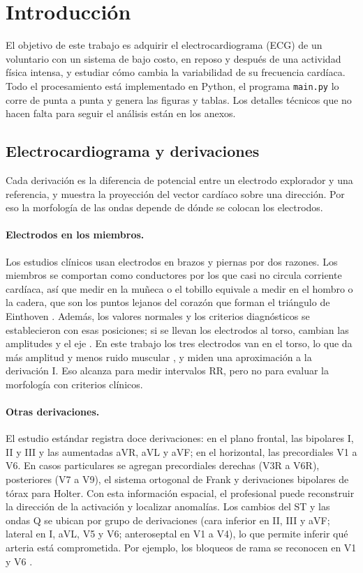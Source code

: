 \section{Introducción}
\label{sec:introduccion}

El objetivo de este trabajo es adquirir el electrocardiograma (ECG) de un voluntario con un sistema de bajo costo, en reposo y después de una actividad física intensa, y estudiar cómo cambia la variabilidad de su frecuencia cardíaca. Todo el procesamiento está implementado en Python, el programa \texttt{main.py} lo corre de punta a punta y genera las figuras y tablas. Los detalles técnicos que no hacen falta para seguir el análisis están en los anexos.

\subsection{Electrocardiograma y derivaciones}
\label{sec:derivaciones}

Cada derivación es la diferencia de potencial entre un electrodo explorador y una referencia, y muestra la proyección del vector cardíaco sobre una dirección. Por eso la morfología de las ondas depende de dónde se colocan los electrodos.

\paragraph{Electrodos en los miembros.}
Los estudios clínicos usan electrodos en brazos y piernas por dos razones. Los miembros se comportan como conductores por los que casi no circula corriente cardíaca, así que medir en la muñeca o el tobillo equivale a medir en el hombro o la cadera, que son los puntos lejanos del corazón que forman el triángulo de Einthoven \parencite{malmivuo1995}. Además, los valores normales y los criterios diagnósticos se establecieron con esas posiciones; si se llevan los electrodos al torso, cambian las amplitudes y el eje \parencite{kligfield2007}. En este trabajo los tres electrodos van en el torso, lo que da más amplitud y menos ruido muscular \parencite{sparkfun_guia}, y miden una aproximación a la derivación I. Eso alcanza para medir intervalos RR, pero no para evaluar la morfología con criterios clínicos.

\paragraph{Otras derivaciones.}
El estudio estándar registra doce derivaciones: en el plano frontal, las bipolares I, II y III y las aumentadas aVR, aVL y aVF; en el horizontal, las precordiales V1 a V6. En casos particulares se agregan precordiales derechas (V3R a V6R), posteriores (V7 a V9), el sistema ortogonal de Frank y derivaciones bipolares de tórax para Holter. Con esta información espacial, el profesional puede reconstruir la dirección de la activación y localizar anomalías. Los cambios del ST y las ondas Q se ubican por grupo de derivaciones (cara inferior en II, III y aVF; lateral en I, aVL, V5 y V6; anteroseptal en V1 a V4), lo que permite inferir qué arteria está comprometida. Por ejemplo, los bloqueos de rama se reconocen en V1 y V6 \parencite{wagner2014}.

